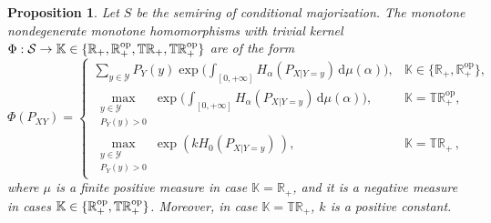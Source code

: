 \documentclass[aps,pra,11pt,onecolumn,nofootinbib,tightenlines]{revtex4-2}
\newtheorem{proposition}[theorem]{Proposition}
\theoremstyle{definition}
\newcommand{\R}{\mathbb{R}}
\newcommand{\T}{\mathbb{T}}
\newcommand{\mc}[1]{\mathcal{#1}}
\newcommand{\mb}[1]{\mathbb{#1}}
\begin{document}
\begin{proposition}
\label{prop: monotone homomorphisms}
Let \( S\) be the semiring of conditional majorization. The monotone nondegenerate monotone homomorphisms with trivial kernel $\Phi:\mc S\to\mb K\in\{\R_+,\R_+^{\rm op},\T\R_+,\T\R_+^{\rm op}\}$ are of the form
\begin{equation}
\label{eq:FinalForm}
\Phi(P_{XY}) =
\begin{cases} 
\displaystyle \sum_{y \in \mathcal{Y}} P_Y(y) \exp\Bigg(\int_{[0,+\infty]} H_\alpha(P_{X|Y=y}) \, \mathrm{d}\mu(\alpha) \Bigg), & \mb K\in\{\mathbb{R}_+,\mathbb{R}_+^{\mathrm{op}}\}, \\
\displaystyle \max \limits_{\substack{y \in \mathcal{Y} \\ P_Y( y) > 0}} \exp\Bigg(\int_{[0,+\infty]} H_\alpha(P_{X|Y=y}) \, \mathrm{d}\mu(\alpha) \Bigg), &\mb K=\mathbb{TR}_+^{\mathrm{op}}, \\
\displaystyle \max \limits_{\substack{y \in \mathcal{Y} \\ P_Y( y) > 0}} \exp\left(k H_0(P_{X|Y=y}) \, \right), &\mb K=\mathbb{TR}_+ \,,
\end{cases}
\end{equation}
where $\mu$ is a finite positive measure in case $\mb K=\mathbb{R}_+$, and it is a negative measure in cases $\mb K\in\{\mathbb{R}_+^{\mathrm{op}},\T\R_+^{\rm op}\}$. Moreover, in case $\mb K=\mathbb{TR}_+$,  $k$ is a positive constant. 
\end{proposition}
\end{document}
